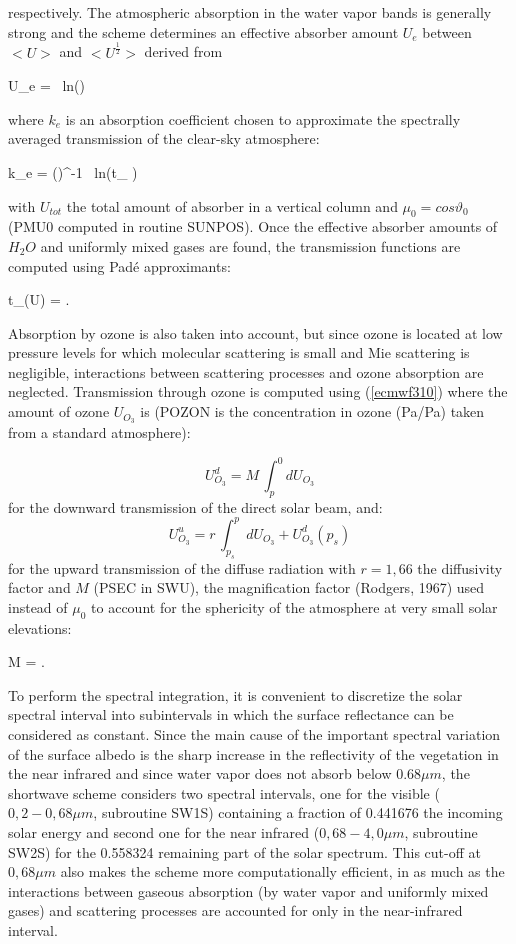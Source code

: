 \noindent respectively. The atmospheric absorption in the water vapor bands is generally strong and the
scheme determines an effective absorber amount $U_e$ between $<U>$ and
$<U^{\frac{1}{2}}>$ derived from

\medskip
\be
U_e =  \, ln()
\label{ecmwf38}
\ee
\medskip

\noindent where $k_e$ is an absorption coefficient chosen to approximate the spectrally averaged transmission of the clear-sky atmosphere:

\medskip
\be
k_e = ()^{-1} \, ln(t_{\Delta\nu} )
\label{ecmwf39}
\ee
\medskip

\noindent with $U_{tot}$ the total amount of absorber in a vertical column and
$\mu_0 = cos\vartheta _0$ (PMU0 computed in routine SUNPOS). Once the effective
absorber amounts of $H_{2}O$ and uniformly mixed gases are found, the
transmission functions are computed using Pad\'e approximants:

\medskip
\be
t_{\Delta\nu}(U) = .
\label{ecmwf310}
\ee
\medskip

Absorption by ozone is also taken into account, but since ozone is located at
low pressure levels for which molecular scattering is small and Mie scattering
is negligible, interactions between scattering processes and ozone absorption
are neglected. Transmission through ozone is computed using (\ref{ecmwf310})
where the amount of ozone $U_{O_3}$ is (POZON is the concentration in ozone
(Pa/Pa) taken from a standard atmosphere):

%
\medskip
\[
U_{O_3}^d = M \, \int_{p}^{0}{dU_{O_3}}
\]
for the downward transmission of the direct solar beam, and:
\[
U_{O_3}^u = r \, \int_{p_s}^{p}{dU_{O_3}} + U_{O_3}^d(p_s)
\]
for the upward transmission of the diffuse radiation with $r = 1,66$ the
diffusivity factor and $M$ (PSEC in SWU), the magnification factor
(Rodgers, 1967) used instead of $\mu_0$ to account for the sphericity of the
atmosphere at very small solar elevations:

\medskip
\be
M = .
\label{ecmwf311}
\ee
\medskip

To perform the spectral integration, it is convenient to discretize the solar
spectral interval into subintervals in which the surface reflectance can be
considered as constant. Since the main cause of the important spectral variation
of the surface albedo is the sharp increase in the reflectivity of the
vegetation in the near infrared and since water vapor does not absorb below
$0.68 \mu m$, the shortwave scheme considers two spectral intervals, one for the
visible ($0,2 - 0,68 \mu m$, subroutine SW1S) containing a fraction of 0.441676
the incoming solar energy and second one for the near infrared
($0,68 - 4,0 \mu m$, subroutine SW2S) for the 0.558324 remaining part of the
solar spectrum. This cut-off at $0,68 \mu m$ also makes the scheme more
computationally efficient, in as much as the interactions between gaseous
absorption (by water vapor and uniformly mixed gases) and scattering processes
are accounted for only in the near-infrared interval.

